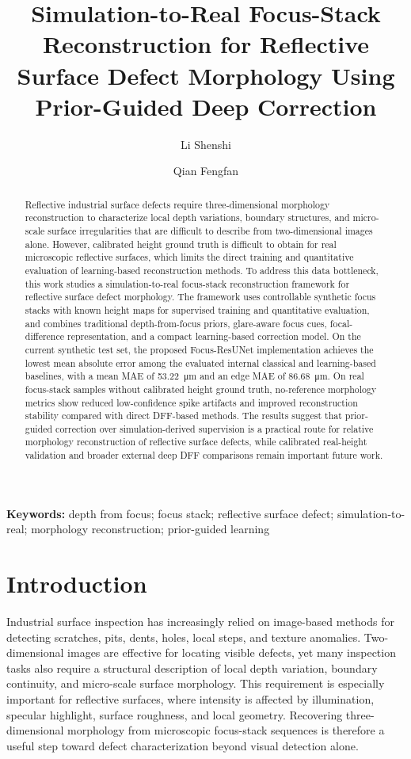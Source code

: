 \documentclass[11pt,a4paper]{article}
\title{Simulation-to-Real Focus-Stack Reconstruction for Reflective Surface Defect Morphology Using Prior-Guided Deep Correction}
\author{Li Shenshi \and Qian Fengfan}
\date{}
\begin{document}
\maketitle

\begin{abstract}
Reflective industrial surface defects require three-dimensional morphology reconstruction to characterize local depth variations, boundary structures, and micro-scale surface irregularities that are difficult to describe from two-dimensional images alone. However, calibrated height ground truth is difficult to obtain for real microscopic reflective surfaces, which limits the direct training and quantitative evaluation of learning-based reconstruction methods. To address this data bottleneck, this work studies a simulation-to-real focus-stack reconstruction framework for reflective surface defect morphology. The framework uses controllable synthetic focus stacks with known height maps for supervised training and quantitative evaluation, and combines traditional depth-from-focus priors, glare-aware focus cues, focal-difference representation, and a compact learning-based correction model. On the current synthetic test set, the proposed Focus-ResUNet implementation achieves the lowest mean absolute error among the evaluated internal classical and learning-based baselines, with a mean MAE of \SI{53.22}{\micro\meter} and an edge MAE of \SI{86.68}{\micro\meter}. On real focus-stack samples without calibrated height ground truth, no-reference morphology metrics show reduced low-confidence spike artifacts and improved reconstruction stability compared with direct DFF-based methods. The results suggest that prior-guided correction over simulation-derived supervision is a practical route for relative morphology reconstruction of reflective surface defects, while calibrated real-height validation and broader external deep DFF comparisons remain important future work.
\end{abstract}

\noindent\textbf{Keywords:} depth from focus; focus stack; reflective surface defect; simulation-to-real; morphology reconstruction; prior-guided learning

\section{Introduction}

Industrial surface inspection has increasingly relied on image-based methods for detecting scratches, pits, dents, holes, local steps, and texture anomalies. Two-dimensional images are effective for locating visible defects, yet many inspection tasks also require a structural description of local depth variation, boundary continuity, and micro-scale surface morphology. This requirement is especially important for reflective surfaces, where intensity is affected by illumination, specular highlight, surface roughness, and local geometry. Recovering three-dimensional morphology from microscopic focus-stack sequences is therefore a useful step toward defect characterization beyond visual detection alone.
\end{document}
